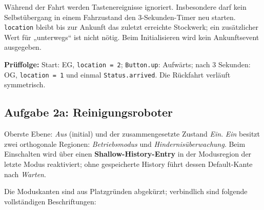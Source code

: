 Während der Fahrt werden Tastenereignisse ignoriert. Insbesondere darf kein Selbstübergang in einem Fahrzustand den 3-Sekunden-Timer neu starten. \texttt{location} bleibt bis zur Ankunft das zuletzt erreichte Stockwerk; ein zusätzlicher Wert für „unterwegs“ ist nicht nötig. Beim Initialisieren wird kein Ankunftsevent ausgegeben.

\textbf{Prüffolge:} Start: EG, \texttt{location = 2}; \texttt{Button.up}: Aufwärts; nach 3 Sekunden: OG, \texttt{location = 1} und einmal \texttt{Status.arrived}. Die Rückfahrt verläuft symmetrisch.
\newpage
\subsection*{Aufgabe 2a: Reinigungsroboter}
Oberste Ebene: \textit{Aus} (initial) und der zusammengesetzte Zustand \textit{Ein}. \textit{Ein} besitzt zwei orthogonale Regionen: \textit{Betriebsmodus} und \textit{Hindernisüberwachung}. Beim Einschalten wird über einen \textbf{Shallow-History-Entry} in der Modusregion der letzte Modus reaktiviert; ohne gespeicherte History führt dessen Default-Kante nach \textit{Warten}.
\begin{center}
\end{center}
Die Moduskanten sind aus Platzgründen abgekürzt; verbindlich sind folgende vollständigen Beschriftungen:

